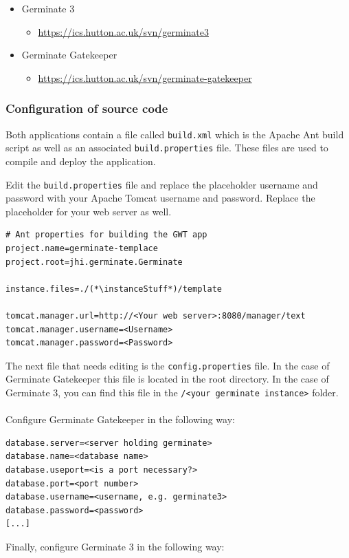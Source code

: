 \begin{itemize}
	\item Germinate 3
	\begin{itemize}
		\item \url{https://ics.hutton.ac.uk/svn/germinate3}
	\end{itemize}
	\item Germinate Gatekeeper
	\begin{itemize}
		\item \url{https://ics.hutton.ac.uk/svn/germinate-gatekeeper}
	\end{itemize}
\end{itemize}

\subsubsection{Configuration of source code}
\label{sec:germinate-config}
Both applications contain a file called \texttt{build.xml} which is the Apache Ant build script as well as an associated \texttt{build.properties} file. These files are used to compile and deploy the application.

Edit the \texttt{build.properties} file and replace the placeholder username and password with your Apache Tomcat username and password. Replace the placeholder for your web server as well.
\begin{lstlisting}[style=EclipseProperties]
# Ant properties for building the GWT app
project.name=germinate-templace
project.root=jhi.germinate.Germinate

instance.files=./(*\instanceStuff*)/template

tomcat.manager.url=http://<Your web server>:8080/manager/text
tomcat.manager.username=<Username>
tomcat.manager.password=<Password>
\end{lstlisting}
\noindent
The next file that needs editing is the \texttt{config.properties} file. In the case of Germinate Gatekeeper this file is located in the root directory. In the case of Germinate 3, you can find this file in the \texttt{\instanceStuff/<your germinate instance>} folder.\\
\\
Configure Germinate Gatekeeper in the following way:

\begin{lstlisting}[style=Properties]
database.server=<server holding germinate>
database.name=<database name>
database.useport=<is a port necessary?>
database.port=<port number>
database.username=<username, e.g. germinate3>
database.password=<password>
[...]
\end{lstlisting}
\noindent
Finally, configure Germinate 3 in the following way:

